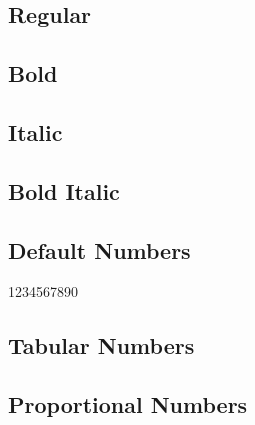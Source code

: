 \documentclass{article}
\begin{document}
\subsection*{Regular}
\lipsum[1]


\subsection*{Bold}

\textbf{\lipsum[2]}


\subsection*{Italic}

\textit{\lipsum[3]}

\subsection*{Bold Italic}

\textbf{\textit{\lipsum[4]}}


\subsection*{Default Numbers}

1234567890

\subsection*{Tabular Numbers}
{}

\subsection*{Proportional Numbers}
{}


\end{document}
